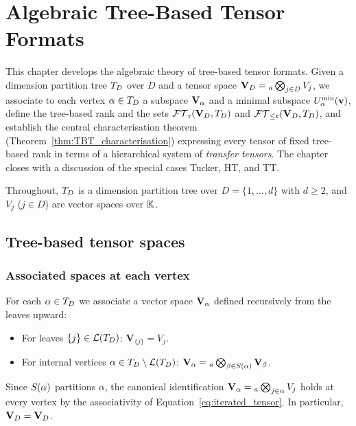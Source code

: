 %
%

\chapter{Algebraic Tree-Based Tensor Formats}
\label{chap:algTBT}

This chapter develops the algebraic theory of tree-based tensor formats.
Given a dimension partition tree $T_D$ over $D$ and a tensor space
$\mathbf{V}_D = {}_a\bigotimes_{j \in D} V_j$, we associate to each vertex
$\alpha \in T_D$ a subspace $\mathbf{V}_\alpha$ and a minimal subspace
$U^{\min}_{\alpha}(\mathbf{v})$, define the tree-based rank and the sets
$\mathcal{FT}_{\mathfrak{r}}(\mathbf{V}_D,T_D)$ and $\mathcal{FT}_{\leq \mathfrak{r}}(\mathbf{V}_D,T_D)$, and establish the central
characterisation theorem (Theorem~\ref{thm:TBT_characterisation})
expressing every tensor of fixed tree-based rank in terms of
a hierarchical system of \emph{transfer tensors}. The chapter
closes with a discussion of the special cases Tucker, HT, and TT.

Throughout, $T_D$ is a dimension partition tree over $D = \{1,\ldots,d\}$
with $d \geq 2$, and $V_j$ ($j \in D$) are vector spaces over $\mathbb{K}$.

\section{Tree-based tensor spaces}
\label{sec:algTBT:spaces}

\subsection*{Associated spaces at each vertex}

For each $\alpha \in T_D$ we associate a vector space $\mathbf{V}_\alpha$
defined recursively from the leaves upward:
\begin{itemize}
\item For leaves $\{j\} \in \mathcal{L}(T_D)$: $\mathbf{V}_{\{j\}} = V_j$.
\item For internal vertices $\alpha \in T_D \setminus \mathcal{L}(T_D)$:
    $\mathbf{V}_\alpha = {}_a\bigotimes_{\beta \in S(\alpha)} \mathbf{V}_\beta$.
\end{itemize}
Since $S(\alpha)$ partitions $\alpha$, the canonical identification
$\mathbf{V}_\alpha = {}_a\bigotimes_{j \in \alpha} V_j$ holds at every vertex
by the associativity of Equation~\eqref{eq:iterated_tensor}.
In particular, $\mathbf{V}_D = \mathbf{V}_D$.

